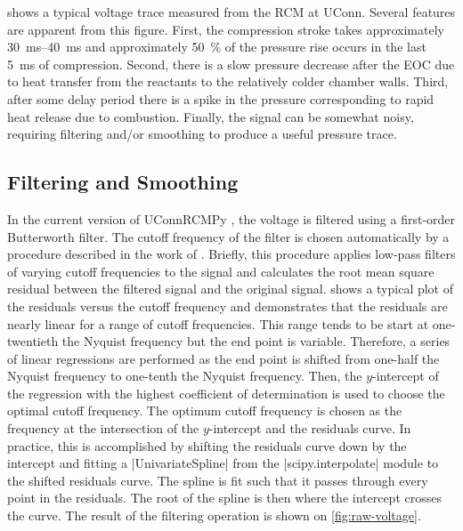 \documentclass[12pt]{../ussci}
\begin{document}
 shows a typical voltage trace measured from the RCM at
UConn. Several features are apparent from this figure. First, the compression
stroke takes approximately \SIrange{30}{40}{\ms} and approximately
\SI{50}{\percent} of the pressure rise occurs in the last \SI{5}{\ms} of
compression. Second, there is a slow pressure decrease after the EOC due to
heat transfer from the reactants to the relatively colder chamber walls. Third,
after some delay period there is a spike in the pressure corresponding to rapid
heat release due to combustion. Finally, the signal can be somewhat noisy,
requiring filtering and/or smoothing to produce a useful pressure trace.

\subsection{Filtering and Smoothing}\label{filtering-and-smoothing}

In the current version of UConnRCMPy \autocite{uconnrcmpy}, the voltage is
filtered using a first-order Butterworth filter. The cutoff frequency of the
filter is chosen automatically by a procedure described in the work of
\textcite{Yu1999}. Briefly, this procedure applies low-pass filters of
varying cutoff frequencies to the signal and calculates the root mean square
residual between the filtered signal and the original signal.
 shows a typical plot of the residuals versus the cutoff
frequency and demonstrates that the residuals are nearly linear for a range of
cutoff frequencies. This range tends to be start at one-twentieth the Nyquist
frequency but the end point is variable. Therefore, a series of linear
regressions are performed as the end point is shifted from one-half the
Nyquist frequency to one-tenth the Nyquist frequency. Then, the $y$-intercept
of the regression with the highest coefficient of determination is used to
choose the optimal cutoff frequency. The optimum cutoff frequency is chosen as
the frequency at the intersection of the $y$-intercept and the residuals curve.
In practice, this is accomplished by shifting the residuals curve down
by the intercept and fitting a \python|UnivariateSpline| from the
\python|scipy.interpolate| module \autocite{Jones2001} to the
shifted residuals curve. The spline is fit such that it passes through every
point in the residuals. The root of the spline is then where the intercept
crosses the curve. The result of the filtering operation is shown on
\cref{fig:raw-voltage}.
\end{document}
